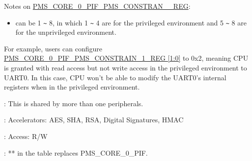 \documentclass[main\_\_EN.tex]{subfiles}
\begin{document}
Notes on \hyperref[regdesc:PMSCORE0PIFPMSCONSTRAIN1REG]{PMS\_CORE\_0\_PIF\_PMS\_CONSTRAN\_\_REG}:
\begin{itemize}
    \item {} can be 1 \verb+~+ 8, in which 1 \verb+~+ 4 are for the privileged environment and 5 \verb+~+ 8 are for the unprivileged environment.
\end{itemize}

For example, users can configure  \hyperref[regdesc:PMSCORE0PIFPMSCONSTRAIN1REG]{PMS\_CORE\_0\_PIF\_PMS\_CONSTRAIN\_1\_REG [1:0]} to 0x2, meaning CPU is granted with read access but not write access in the privileged environment to UART0. In this case, CPU won't be able to modify the UART0's internal registers when in the privileged environment.
\begin{ThreePartTable}

\begin{TableNotes}
\item[1]: This is shared by more than one peripherals.
\item[2]: Accelerators: AES, SHA, RSA, Digital Signatures, HMAC
\item[3]: Access: R/W
\item[4]: ** in the table replaces PMS\_CORE\_0\_PIF.
\end{TableNotes}


\end{ThreePartTable}
\end{document}

